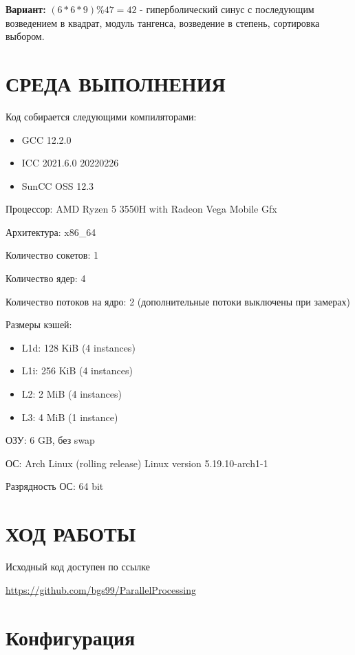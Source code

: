 \documentclass[14pt, a4paper, oneside, final]{extarticle}
\begin{document}
\textbf{Вариант:} $(6*6*9) \% 47 = 42$ - гиперболический синус с последующим возведением в квадрат, модуль тангенса, возведение в степень, сортировка выбором.

\clearpage
\section*{СРЕДА ВЫПОЛНЕНИЯ}

Код собирается следующими компиляторами:
\begin{itemize}
 \setlength{\itemindent}{3em}
 \item GCC 12.2.0
 \item ICC 2021.6.0 20220226
 \item SunCC OSS 12.3
\end{itemize}

Процессор: AMD Ryzen 5 3550H with Radeon Vega Mobile Gfx

Архитектура: x86\_64

Количество сокетов: 1

Количество ядер: 4

Количество потоков на ядро: 2 (дополнительные потоки выключены при замерах)

Размеры кэшей:
\begin{itemize}
 \setlength{\itemindent}{3em}
 \item L1d: 128 KiB (4 instances)
 \item L1i: 256 KiB (4 instances)
 \item L2: 2 MiB (4 instances)
 \item L3: 4 MiB (1 instance)
\end{itemize}

ОЗУ: 6 GB, без swap

ОС: Arch Linux (rolling release) Linux version 5.19.10-arch1-1

Разрядность ОС: 64 bit


\clearpage
\section*{ХОД РАБОТЫ}
Исходный код доступен по ссылке

\url{https://github.com/bgs99/ParallelProcessing}

\clearpage

\section*{Конфигурация}
\end{document}
